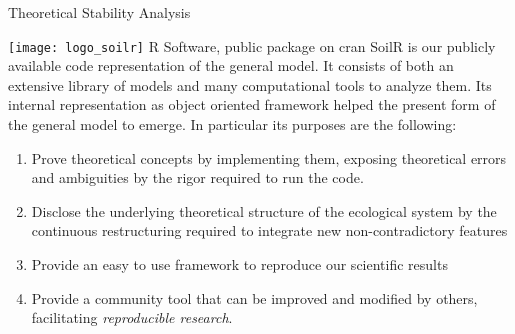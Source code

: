 \documentclass[final,hyperref={pdfpagelabels=false}, professionalmath, mathserif, 11pt]{beamer}
\begin{document}
\begin{frame}
\begin{columns}
\begin{column}{.48\textwidth}
\begin{minipage}[T]{.95\textwidth}
\begin{block}{Theoretical Stability Analysis}
\begin{figure}
	\end{figure}
      \end{block}
      \begin{block}{
	  \texttt{[image: logo\_soilr]} 
	  \hspace{1cm}
	  R Software,
	  public package on cran
	  }
	 SoilR is our publicly available code representation of the general model. It consists of both an extensive library of models and many computational tools to analyze them.  Its internal representation as object oriented framework helped the present form of the general model to emerge. In particular its purposes are the following:
	 \begin{enumerate}
	 \item Prove theoretical concepts by implementing them, exposing theoretical errors and ambiguities by the rigor required to run the code.
	 \item Disclose the underlying theoretical structure of the ecological system by the continuous restructuring required to integrate new non-contradictory features
	 \item Provide an easy to use framework to reproduce our scientific results
	 \item Provide a community tool that can be improved and modified by others, facilitating \emph{reproducible research}. 
	 \end{enumerate}
	 


\end{block}
\end{minipage}
\end{column}
\end{columns}
\end{frame}
\end{document}
